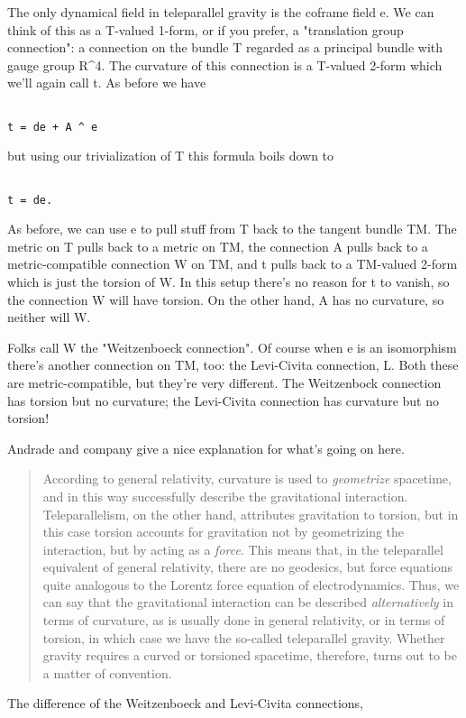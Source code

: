 The only dynamical field in teleparallel gravity is the coframe field e.
We can think of this as a T-valued 1-form, or if you prefer, a
"translation group connection": a connection on the bundle T regarded 
as a principal bundle with gauge group R^{4}.  The curvature of this
connection is a T-valued 2-form which we'll again call t.  As before
we have


\begin{verbatim}

t = de + A ^ e
\end{verbatim}
    
but using our trivialization of T this formula boils down to


\begin{verbatim}

t = de.
\end{verbatim}
    
As before, we can use e to pull stuff from T back to the tangent bundle
TM.  The metric on T pulls back to a metric on TM, the connection A
pulls back to a metric-compatible connection W on TM, and t pulls back
to a TM-valued 2-form which is just the torsion of W.  In this setup
there's no reason for t to vanish, so the connection W will have
torsion.  On the other hand, A has no curvature, so neither will W.

Folks call W the "Weitzenboeck connection".  Of course when e is an
isomorphism there's another connection on TM, too: the Levi-Civita
connection, L.  Both these are metric-compatible, but they're very
different.  The Weitzenbock connection has torsion but no curvature; 
the Levi-Civita connection has curvature but no torsion!  

Andrade and company give a nice explanation for what's going on here.

\begin{quote}
According to general relativity, curvature is used to \emph{geometrize}
spacetime, and in this way successfully describe the gravitational 
interaction.  Teleparallelism, on the other hand, attributes gravitation 
to torsion, but in this case torsion accounts for gravitation not
by geometrizing the interaction, but by acting as a \emph{force}.  This
means that, in the teleparallel equivalent of general relativity,
there are no geodesics, but force equations quite analogous to the 
Lorentz force equation of electrodynamics.  Thus, we can say that the 
gravitational interaction can be described \emph{alternatively} in terms 
of curvature, as is usually done in general relativity, or in 
terms of torsion, in which case we have the so-called teleparallel 
gravity.  Whether gravity requires a curved or torsioned spacetime, 
therefore, turns out to be a matter of convention.
\end{quote}
The difference of the Weitzenboeck and Levi-Civita connections,


